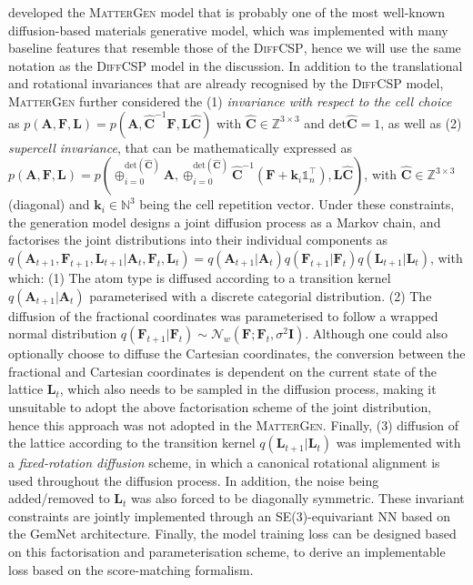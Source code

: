 \citet{zeni2025generative} developed the \textsc{MatterGen} model that is probably one of the most well-known diffusion-based materials generative model, which was implemented with many baseline features that resemble those of the \textsc{DiffCSP},\cite{jiao2023crystal} hence we will use the same notation as the \textsc{DiffCSP} model in the discussion. In addition to the translational and rotational invariances that are already recognised by the  \textsc{DiffCSP} model, \textsc{MatterGen} further considered the (1) \emph{invariance with respect to the cell choice} as $p(\bm{A},\bm{F},\bm{L})=p(\bm{A},\hat{\bm{C}}^{-1}\bm{F},\bm{L}\hat{\bm{C}})$ with $\hat{\bm{C}}\in\mathbb{Z}^{3\times3}$ and $\mathrm{det}\hat{\bm{C}}=1$, as well as (2) \emph{supercell invariance}, that can be mathematically expressed as $p(\bm{A},\bm{F},\bm{L})=p(\oplus_{i=0}^{\mathrm{det}(\hat{\bm{C}})}\bm{A}, \oplus_{i=0}^{\mathrm{det}(\hat{\bm{C}})}\hat{\bm{C}}^{-1}\left(\bm{F}+\bm{k}_i\mathds{1}_n^\top \right) , \bm{L}\hat{\bm{C}})$, with $\hat{\bm{C}}\in\mathbb{Z}^{3\times 3}$ (diagonal) and $\bm{k}_i\in\mathbb{N}^3$  being the cell repetition vector. Under these constraints, the generation model designs a joint diffusion process as a Markov chain, and factorises the joint distributions into their individual components as $q\left( \bm{A}_{t+1},\bm{F}_{t+1},\bm{L}_{t+1}|\bm{A}_t,\bm{F}_t,\bm{L}_t\right)= q(\bm{A}_{t+1}|\bm{A}_t) q(\bm{F}_{t+1}|\bm{F}_t) q(\bm{L}_{t+1}|\bm{L}_t)$, with which: (1) The atom type is diffused according to a transition kernel $q(\bm{A}_{t+1}|\bm{A}_t)$ parameterised with a discrete categorial distribution. (2) The diffusion of the fractional coordinates was parameterised to follow a wrapped normal distribution $q(\bm{F}_{t+1}|\bm{F}_t)\sim \mathcal{N}_w(\bm{F};\bm{F}_t,\sigma^2\bm{I})$. Although one could also optionally choose to diffuse the Cartesian coordinates, the conversion between the fractional and Cartesian coordinates is dependent on the current state of the lattice $\bm{L}_t$, which also needs to be sampled in the diffusion process, making it unsuitable to adopt the above factorisation scheme of the joint distribution, hence this approach was not adopted in the \textsc{MatterGen}. Finally, (3) diffusion of the lattice according to the transition kernel $q(\bm{L}_{t+1}|\bm{L}_t)$ was implemented with a \emph{fixed-rotation diffusion} scheme, in which a canonical rotational alignment is used throughout the diffusion process. In addition, the noise being added/removed to $\bm{L}_t$ was also forced to be diagonally symmetric. These invariant constraints are jointly implemented through an SE(3)-equivariant NN based on the GemNet architecture.\cite{gasteiger2021gemnet} Finally, the model training loss can be designed based on this factorisation and parameterisation scheme, to derive an implementable loss based on the score-matching\cite{jo2022score} formalism.

